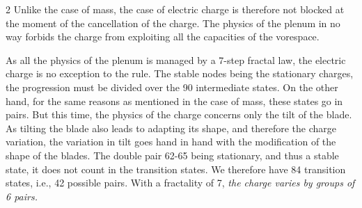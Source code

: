 \begin{multicols}{2}
	Unlike the case of mass, the case of electric charge is therefore 
	not blocked at the moment of the cancellation of the charge. The 
	physics of the plenum in no way forbids the charge from exploiting 
	all the capacities of the vorespace.
	\vspace*{-0.5cm}
	\begin{center}
	\end{center}
	
	As all the physics of the plenum is managed by a 7-step fractal law, the 
	electric charge is no exception to the rule. The stable nodes being the 
	stationary charges, the progression must be divided over the 90 intermediate 
	states. On the other hand, for the same reasons as mentioned in the case 
	of mass, these states go in pairs. But this time, the physics of the 
	charge concerns only the tilt of the blade. As tilting the blade also 
	leads to adapting its shape, and therefore the charge variation, the 
	variation in tilt goes hand in hand with the modification of the shape of 
	the blades. The double pair 62-65 being stationary, and thus a stable 
	state, it does not count in the transition states. We therefore have 84 
	transition states, i.e., 42 possible pairs. With a fractality of 7, 
	\textit{the charge varies by groups of 6 pairs.}
	

\end{multicols}
